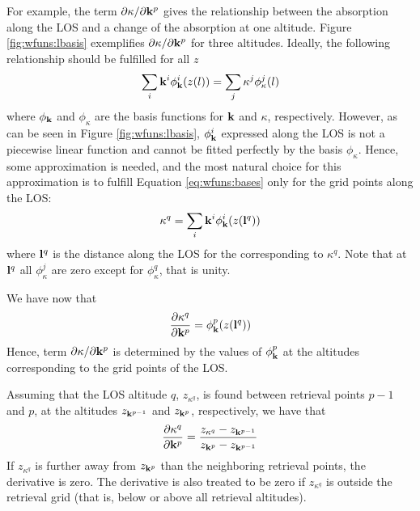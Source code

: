  For example, the term $\partial\kappa/ \partial \mathbf{k}^p$ gives the
 relationship between the absorption along the LOS and a change of the
 absorption at one altitude.  Figure \ref{fig:wfuns:lbasis}
 exemplifies $\partial\kappa/ \partial \mathbf{k}^p$ for three altitudes.
 Ideally, the following relationship should be fulfilled for all $z$
 \begin{equation}
   \sum_i\mathbf{k}^i\phi^i_{\mathbf{k}}(z(l)) = \sum_j \kappa^j\phi^j_{\kappa}(l)
  \label{eq:wfuns:bases}
 \end{equation}
 where $\phi_{\mathbf{k}}$ and $\phi_{\kappa}$ are the basis functions for
 $\mathbf{k}$ and $\kappa$, respectively. However, as can be seen in
 Figure \ref{fig:wfuns:lbasis}, $\phi^i_{\mathbf{k}}$ expressed along the
 LOS is not a piecewise linear function and cannot be fitted perfectly
 by the basis $\phi_{\kappa}$. Hence, some approximation is needed,
 and the most natural choice for this approximation is to fulfill
 Equation \ref{eq:wfuns:bases} only for the grid points along the LOS:
 \begin{equation}
   \kappa^q = \sum_i\mathbf{k}^i\phi^i_{\mathbf{k}}(z(\mathbf{l}^q))
 \end{equation}
 where $\mathbf{l}^q$ is the distance along the LOS for the corresponding to
 $\kappa^q$. Note that at $\mathbf{l}^q$ all $\phi_{\kappa}^j$ are zero except
 for $\phi_{\kappa}^q$, that is unity.

 We have now that
 \begin{equation}
   \frac{\partial \kappa^q}{\partial \mathbf{k}^p} = \phi^p_{\mathbf{k}}(z(\mathbf{l}^q))
  \label{eq:wfuns:kappak}
 \end{equation}
 Hence, term $\partial\kappa/ \partial \mathbf{k}^p$ is determined by the
 values of $\phi^p_{\mathbf{k}}$ at the altitudes corresponding to the grid
 points of the LOS.
 
 Assuming that the LOS altitude $q$, $z_{\kappa^q}$, is found between
 retrieval points $p-1$ and $p$, at the altitudes $z_{\mathbf{k}^{p-1}}$ and 
 $z_{\mathbf{k}^p}$, respectively, we have that
 \begin{equation}
   \frac{\partial \kappa^q}{\partial \mathbf{k}^p} =
   \frac{z_{\kappa^q}-z_{\mathbf{k}^{p-1}}}{z_{\mathbf{k}^{p}}-z_{\mathbf{k}^{p-1}}}
  \label{eq:wfuns:zz}
 \end{equation}
 If $z_{\kappa^q}$ is further away from $z_{\mathbf{k}^p}$ than the neighboring
 retrieval points, the derivative is zero. The derivative is also treated to 
 be zero if $z_{\kappa^q}$ is outside the retrieval grid (that is, below
 or above all retrieval altitudes).

